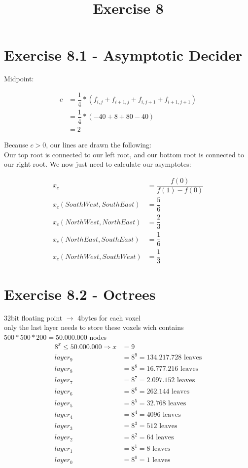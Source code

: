\documentclass[a4paper]{article}
\date{}
\author{}
\title{Exercise 8}
\begin{document}
\maketitle 
\thispagestyle{fancy}


\section*{Exercise 8.1 - Asymptotic Decider}

Midpoint:

\begin{align*}
	c &= \dfrac{1}{4}*(f_{i,j} + f_{i+1,j} + f_{i,j+1} + f_{i+1,j+1})\\
	&= \dfrac{1}{4}*(-40 + 8 + 80 -40)\\
	&= 2
\end{align*}

Because $ c > 0 $, our lines are drawn the following:\\
Our top root is connected to our left root, and our bottom root is connected to our right root. We now
just need to calculate our asymptotes:

\begin{align*}
x_c &= \dfrac{f(0)}{f(1) - f(0)}\\
x_c(SouthWest, SouthEast) &= \dfrac{5}{6}\\
x_c(NorthWest, NorthEast) &= \dfrac{2}{3}\\
x_c(NorthEast, SouthEast) &= \dfrac{1}{6}\\
x_c(NorthWest, SouthWest) &= \dfrac{1}{3}
\end{align*}

\section*{Exercise 8.2 - Octrees}

32bit floating point $\rightarrow$ 4bytes for each voxel\\
only the last layer needs to store these voxels wich contains $ 500*500*200 = 50.000.000 $ nodes
\begin{align*}
8^x \leq 50.000.000 \Rightarrow x &= 9\\
layer_{9} &= 8^9 = 134.217.728 \text{ leaves}\\
layer_{8} &= 8^8 = 16.777.216 \text{ leaves}\\
layer_{7} &= 8^7 = 2.097.152 \text{ leaves}\\
layer_{6} &= 8^6 = 262.144 \text{ leaves}\\
layer_{5} &= 8^5 = 32.768 \text{ leaves}\\
layer_{4} &= 8^4 = 4096 \text{ leaves}\\
layer_{3} &= 8^3 = 512 \text{ leaves}\\
layer_{2} &= 8^2 = 64 \text{ leaves}\\
layer_{1} &= 8^1 = 8 \text{ leaves}\\
layer_{0} &= 8^0 = 1 \text{ leaves}
\end{align*}
\end{document}
